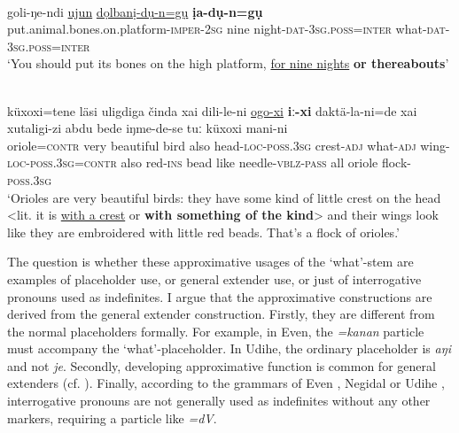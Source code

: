 \documentclass[output=paper,colorlinks,citecolor=brown
\ChapterDOI{10.5281/zenodo.15697577}
]{langscibook}
\begin{document}
 \ea \label{ex.ge.evn.noun}
 \\
 \gll goli-ŋe-ndi \uline{ujun} \uline{dọlbanị-dụ-n=gụ} \textbf{ịa-dụ-n=gụ}\\
put.animal.bones.on.platform-\textsc{imper}-\textsc{2sg} nine night-\textsc{dat}-\textsc{3sg.poss}=\textsc{inter} what-\textsc{dat}-\textsc{3sg.poss}=\textsc{inter}\\
\glt `You should put its bones on the high platform, \uline{for nine nights} \textbf{or thereabouts}' \\
 \z
{}


 \ea \label{ex.ge.ude.adj}
 \\
 \gll küxoxi=tene läsi uligdiga činda xai dili-le-ni \uline{ogo-xi} \textbf{iː-xi} daktä-la-ni=de xai xutaligi-zi abdu bede iŋme-de-se tuː küxoxi mani-ni\\
oriole=\textsc{contr} very beautiful bird also head-\textsc{loc}-\textsc{poss.3sg} crest-\textsc{adj} what-\textsc{adj} wing-\textsc{loc}-\textsc{poss.3sg}=\textsc{contr} also red-\textsc{ins} bead like needle-\textsc{vblz}-\textsc{pass} all oriole flock-\textsc{poss.3sg}\\
\glt `Orioles are very beautiful birds: they have some kind of little crest on the head <lit. it is \uline{with a crest} or \textbf{with something of the kind}> and their wings look like they are embroidered with little red beads. That's a flock of orioles.' \\
 \z
{}

The question is whether these approximative usages of the `what'-stem are examples of placeholder use, or general extender use, or just of interrogative pronouns used as indefinites. I argue that the approximative constructions are derived from the general extender construction. Firstly, they are different from the normal placeholders formally. For example, in Even, the \textit{=kanan} particle must accompany the `what'-placeholder. In Udihe, the ordinary placeholder is \textit{aŋi} and not \textit{je}. Secondly, developing approximative function is common for general extenders (cf. \citealt{kim2020korean}). Finally, according to the grammars of Even \citep[12]{malchukov1995even}, Negidal \citep[22]{cincius1982} or Udihe \citep[353]{nikolaeva2001grammar}, interrogative pronouns are not generally used as indefinites without any other markers, requiring a particle like \textit{=dV}.
\end{document}
